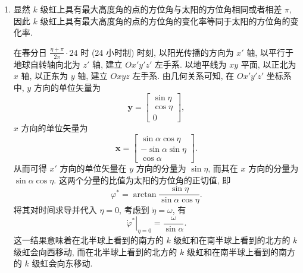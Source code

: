 \documentclass{article}
\begin{document}
\begin{enumerate}
\begin{enumerate}
	\item
	显然 $k$ 级虹上具有最大高度角的点的方位角与太阳的方位角相同或者相差 $\pi$, 因此 $k$ 级虹上具有最大高度角的点的方位角的变化率等同于太阳的方位角的变化率.

	在春分日 $\frac{\eta+\pi}{2\pi}\cdot 24$ 时 (24 小时制) 时刻, 以阳光传播的方向为 $x'$ 轴, 以平行于地球自转轴向北为 $z'$ 轴, 建立 $Ox'y'z'$ 左手系.
	以地平线为 $xy$ 平面, 以正北为 $x$ 轴, 以正东为 $y$ 轴, 建立 $Oxyz$ 左手系.
	由几何关系可知, 在 $Ox'y'z'$ 坐标系中, $y$ 方向的单位矢量为
	\begin{equation}
		\mathbf y=\left[\begin{matrix}\sin\eta \\ \cos\eta \\ 0\end{matrix}\right],
	\end{equation}
	$x$ 方向的单位矢量为
	\begin{equation}
		\mathbf x=\left[\begin{matrix}\sin\alpha\cos\eta \\ -\sin\alpha\sin\eta \\ \cos\alpha\end{matrix}\right].
	\end{equation}
	从而可得 $x'$ 方向的单位矢量在 $y$ 方向的分量为 $\sin\eta$, 而其在 $x$ 方向的分量为 $\sin\alpha\cos\eta$.
	这两个分量的比值为太阳的方位角的正切值, 即
	\begin{equation}
		\varphi^*=\arctan\frac{\sin\eta}{\sin\alpha\cos\eta}.
		\label{eq:太阳的方位角}
	\end{equation}
	将其对时间求导并代入 $\eta=0$, 考虑到 $\dot\eta=\omega$, 有
	\begin{equation}
		\left.\dot\varphi^*\right|_{\eta=0}=\frac\omega{\sin\alpha}.
	\end{equation}
	这一结果意味着在北半球上看到的南方的 $k$ 级虹和在南半球上看到的北方的 $k$ 级虹会向西移动, 而在北半球上看到的北方的 $k$ 级虹和在南半球上看到的南方的 $k$ 级虹会向东移动.

\end{enumerate}

\end{enumerate}
\end{document}
